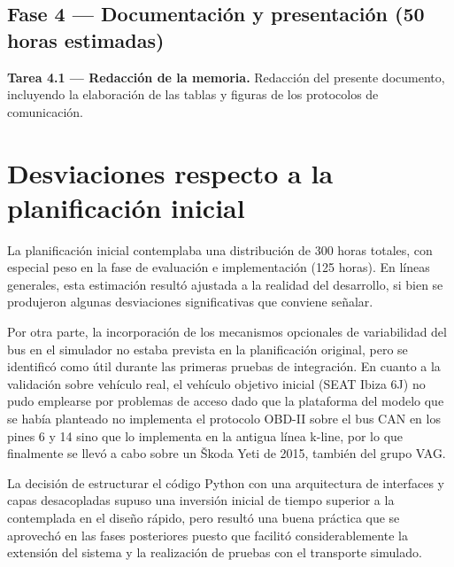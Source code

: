 \subsection{Fase 4 — Documentación y presentación \textnormal{(50 horas estimadas)}}

\textbf{Tarea 4.1 — Redacción de la memoria.} Redacción del presente documento, incluyendo la elaboración de las tablas y figuras de los protocolos de comunicación.

\section{Desviaciones respecto a la planificación inicial}

La planificación inicial contemplaba una distribución de 300 horas totales, con especial peso en la fase de evaluación e implementación (125 horas). En líneas generales, esta estimación resultó ajustada a la realidad del desarrollo, si bien se produjeron algunas desviaciones significativas que conviene señalar.

Por otra parte, la incorporación de los mecanismos opcionales de variabilidad del bus en el simulador no estaba prevista en la planificación original, pero se identificó como útil durante las primeras pruebas de integración. En cuanto a la validación sobre vehículo real, el vehículo objetivo inicial (SEAT Ibiza 6J) no pudo emplearse por problemas de acceso dado que la plataforma del modelo que se había planteado no implementa el protocolo OBD-II sobre el bus CAN en los pines 6 y 14 sino que lo implementa en la antigua línea k-line, por lo que finalmente se llevó a cabo sobre un Škoda Yeti de 2015, también del grupo VAG.

La decisión de estructurar el código Python con una arquitectura de interfaces y capas desacopladas supuso una inversión inicial de tiempo superior a la contemplada en el diseño rápido, pero resultó una buena práctica que se aprovechó en las fases posteriores puesto que facilitó considerablemente la extensión del sistema y la realización de pruebas con el transporte simulado.
